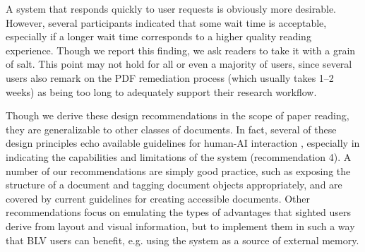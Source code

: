 A system that responds quickly to user requests is obviously more desirable. However, several participants indicated that some wait time is acceptable, especially if a longer wait time corresponds to a higher quality reading experience. Though we report this finding, we ask readers to take it with a grain of salt. This point may not hold for all or even a majority of users, since several users also remark on the PDF remediation process (which usually takes 1--2 weeks) as being too long to adequately support their research workflow.

Though we derive these design recommendations in the scope of paper reading, they are generalizable to other classes of documents. In fact, several of these design principles echo available guidelines for human-AI interaction \citep{Amershi2019GuidelinesFH}, especially in indicating the capabilities and limitations of the system (recommendation 4). A number of our recommendations are simply good practice, such as exposing the structure of a document and tagging document objects appropriately, and are covered by current guidelines for creating accessible documents. Other recommendations focus on emulating the types of advantages that sighted users derive from layout and visual information, but to implement them in such a way that BLV users can benefit, e.g. using the system as a source of external memory.
